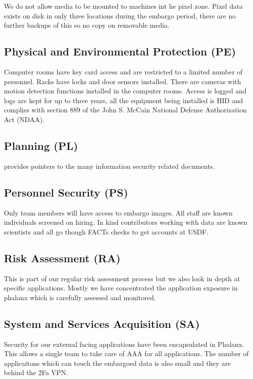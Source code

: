 We do not allow media to be mounted to machines int he pixel zone.
Pixel data exists on disk in only three locations during the embargo period, there are no further backups of this so no copy on removable media.

\subsection{Physical and Environmental Protection (PE)} \label{sec:PE}
Computer rooms have key card access and are restricted to a limited number of personnel.
Racks have locks and door sensors installed.
There are cameras with motion detection functions installed in the computer rooms.
Access is logged and logs are kept for up to three years, all the equipment being installed is HID and complies with section 889 of the John S. McCain National Defense Authorization Act (NDAA).

\subsection{Planning (PL)} \label{sec:PL}
 provides pointers to the many information security related documents.

\subsection{Personnel Security (PS)} \label{sec:PS}
Only  team members will have access to embargo images.
All staff are known individuals screened on hiring.
In kind contributors working with data  are known scientists and all go though FACTs checks to get accounts at USDF.


\subsection{Risk Assessment (RA)} \label{sec:RA}
This is part of our regular risk assessment process  but we also look in depth at specific applications.
Mostly we have concentrated the application exposure in phalanx which is carefully assessed and monitored.

\subsection{System and Services Acquisition (SA)} \label{sec:SA}
Security for our external facing applications have been encapsulated in Phalanx.
This allows a single team to take care of AAA for all applications.
The number of applicaitons which can touch the embargoed data is also small and they are behind the 2Fa VPN.


